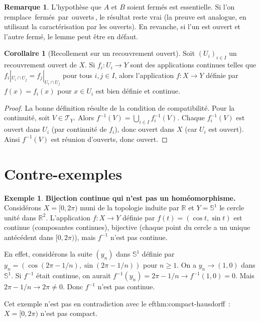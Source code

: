 \documentclass[12pt,a4paper,openany]{book}
\theoremstyle{definition}
\theoremstyle{cours}
\newtheorem{corollaire}[theoreme]{Corollaire}
\theoremstyle{coursnormal}
\newtheorem{remarque}[theoreme]{Remarque}
\newtheorem{exemple}[theoreme]{Exemple}
\newcommand{\R}{\mathbb{R}}
\newcommand{\T}{\mathcal{T}}
\providecommand{\og}{\guillemotleft\,}
\providecommand{\fg}{\,\guillemotright}
\begin{document}
\begin{remarque}
  L'hypothèse que $A$ et $B$ soient fermés est essentielle. Si l'on remplace
  \og{}fermés\fg{} par \og{}ouverts\fg{}, le résultat reste vrai (la preuve
  est analogue, en utilisant la caractérisation par les ouverts). En revanche,
  si l'un est ouvert et l'autre fermé, le lemme peut être en défaut.
\end{remarque}

\begin{corollaire}[Recollement sur un recouvrement ouvert]\label{cor:cor:recollement-ouvert}
  Soit $(U_i)_{i\in I}$ un recouvrement ouvert de $X$. Si
  $f_i\colon U_i\to Y$ sont des applications continues telles que
  $f_i|_{U_i\cap U_j}=f_j|_{U_i\cap U_j}$ pour tous $i,j\in I$, alors
  l'application $f\colon X\to Y$ définie par $f(x)=f_i(x)$ pour $x\in U_i$
  est bien définie et continue.
\end{corollaire}

\begin{proof}
  La bonne définition résulte de la condition de compatibilité. Pour la
  continuité, soit $V\in\T_Y$. Alors
  $f^{-1}(V) = \bigcup_{i\in I} f_i^{-1}(V)$. Chaque $f_i^{-1}(V)$ est
  ouvert dans $U_i$ (par continuité de $f_i$), donc ouvert dans $X$ (car
  $U_i$ est ouvert). Ainsi $f^{-1}(V)$ est réunion d'ouverts, donc ouvert.
\end{proof}

\section{Contre-exemples}\label{sec:contre-exemples-ch4}

\begin{exemple}\label{ex:bijection-continue-non-homeo}
  \textbf{Bijection continue qui n'est pas un homéomorphisme.}
  Considérons $X=[0,2\pi)$ muni de la topologie induite par $\R$ et
  $Y=\mathbb{S}^1$ le cercle unité dans $\R^2$. L'application
  $f\colon X\to Y$ définie par $f(t)=(\cos t,\sin t)$ est continue (composantes
  continues), bijective (chaque point du cercle a un unique antécédent dans
  $[0,2\pi)$), mais $f^{-1}$ n'est pas continue.

  En effet, considérons la suite $(y_n)$ dans $\mathbb{S}^1$ définie par
  $y_n = (\cos(2\pi-1/n),\sin(2\pi-1/n))$ pour $n\geq 1$. On a $y_n\to(1,0)$
  dans $\mathbb{S}^1$. Si $f^{-1}$ était continue, on aurait
  $f^{-1}(y_n)=2\pi-1/n\to f^{-1}(1,0)=0$. Mais $2\pi-1/n\to 2\pi\neq 0$.
  Donc $f^{-1}$ n'est pas continue.

  Cet exemple n'est pas en contradiction avec le 
ef{thm:compact-hausdorff}~:
  $X=[0,2\pi)$ n'est pas compact.
\end{exemple}
\end{document}
